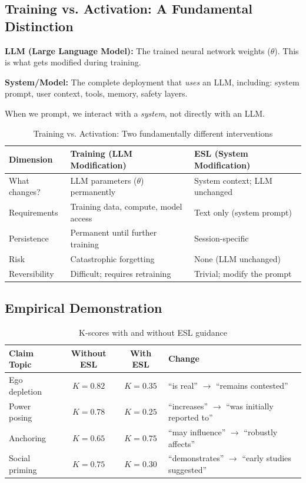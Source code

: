 \documentclass[11pt,a4paper]{article}
\begin{document}
\subsection{Training vs. Activation: A Fundamental Distinction}

\begin{termbox}
\textbf{LLM (Large Language Model):} The trained neural network weights ($\theta$). This is what gets modified during training.

\textbf{System/Model:} The complete deployment that \emph{uses} an LLM, including: system prompt, user context, tools, memory, safety layers.

When we prompt, we interact with a \emph{system}, not directly with an LLM.
\end{termbox}

\begin{table}[H]
\centering
\caption{Training vs. Activation: Two fundamentally different interventions}
\begin{tabular}{p{3cm}p{5cm}p{5cm}}
\toprule
\textbf{Dimension} & \textbf{Training (LLM Modification)} & \textbf{ESL (System Modification)} \\
\midrule
What changes? & LLM parameters ($\theta$) permanently & System context; LLM unchanged \\
Requirements & Training data, compute, model access & Text only (system prompt) \\
Persistence & Permanent until further training & Session-specific \\
Risk & Catastrophic forgetting & None (LLM unchanged) \\
Reversibility & Difficult; requires retraining & Trivial; modify the prompt \\
\bottomrule
\end{tabular}
\end{table}


\subsection{Empirical Demonstration}

\begin{table}[H]
\centering
\caption{K-scores with and without ESL guidance}
\begin{tabular}{lccl}
\toprule
\textbf{Claim Topic} & \textbf{Without ESL} & \textbf{With ESL} & \textbf{Change} \\
\midrule
Ego depletion & $K = 0.82$ & $K = 0.35$ & ``is real'' $\rightarrow$ ``remains contested'' \\
Power posing & $K = 0.78$ & $K = 0.25$ & ``increases'' $\rightarrow$ ``was initially reported to'' \\
Anchoring & $K = 0.65$ & $K = 0.75$ & ``may influence'' $\rightarrow$ ``robustly affects'' \\
Social priming & $K = 0.75$ & $K = 0.30$ & ``demonstrates'' $\rightarrow$ ``early studies suggested'' \\
\bottomrule
\end{tabular}
\end{table}
\end{document}
